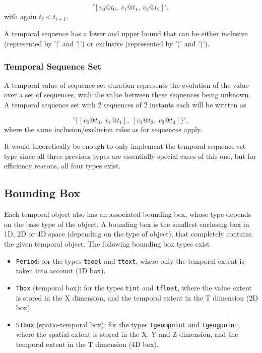 \[
    '[v_0@t_0,\ v_1@t_1,\ v_2@t_2]',
\]
with again \(t_i < t_{i+1}\).

A temporal sequence has a lower and upper bound that can be either inclusive (represented by '[' and ']') or exclusive (represented by '(' and ')').

\subsubsection{Temporal Sequence Set}
\label{section:mobilitydb_s}

A temporal value of sequence set duration represents the evolution of the value over a set of sequences, with the value between these sequences being unknown. A temporal sequence set with 2 sequences of 2 instants each will be written as

\[
    '\{[v_0@t_0,\ v_1@t_1],\ [v_2@t_2,\ v_3@t_3]\}',
\]
where the same inclusion/exclusion rules as for sequences apply.

It would theoretically be enough to only implement the temporal sequence set type since all three previous types are essentially special cases of this one, but for efficiency reasons, all four types exist.

\subsection{Bounding Box}
\label{section:mobilitydb_bbox}

Each temporal object also has an associated bounding box, whose type depends on the base type of the object. A bounding box is the smallest enclosing box in 1D, 2D or 4D space (depending on the type of object), that completely contains the given temporal object. The following bounding box types exist

\begin{itemize}
    \item \lstinline{Period}: for the types \lstinline{tbool} and \lstinline{ttext}, where only the temporal extent is taken into account (1D box).
    \item \lstinline{Tbox} (temporal box): for the types \lstinline{tint} and \lstinline{tfloat}, where the value extent is stored in the X dimension, and the temporal extent in the T dimension (2D box).
    \item \lstinline{STbox} (spatio-temporal box): for the types \lstinline{tgeompoint} and \lstinline{tgeogpoint}, where the spatial extent is stored in the X, Y and Z dimension, and the temporal extent in the T dimension (4D box).
\end{itemize}

